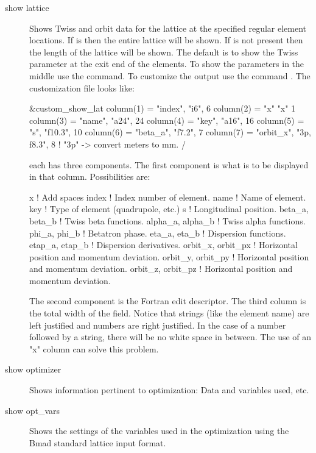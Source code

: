 {{{\begin{description}
  \item[show lattice]
Shows Twiss and orbit data for the  lattice at the specified
regular element locations. If  is  then the
entire lattice will be shown. If  is not present then
the length of the lattice will be shown. The default is to show the Twiss
parameter at the exit end of the elements. To show the parameters in the 
middle use the  command. To customize the output
use the command . The customization
file looks like:
\begin{example}
  &custom_show_lat
    column(1) = "index",   "i6",     6 
    column(2) = "x"        "x"       1
    column(3) = "name",    "a24",   24
    column(4) = "key",     "a16",   16
    column(5) = "s",       "f10.3", 10
    column(6) = "beta_a",  "f7.2",   7
    column(7) = "orbit_x", "3p, f8.3", 8   ! "3p" -> convert meters to mm.
  /
\end{example}
each  has three components. The first component is what is to be 
displayed in that column. Possibilities are:
\begin{example}
  x                  ! Add spaces
  index              ! Index number of element.
  name               ! Name of element.
  key                ! Type of element (quadrupole, etc.)
  s                  ! Longitudinal position.
  beta_a,  beta_b    ! Twiss beta functions.
  alpha_a, alpha_b   ! Twiss alpha functions.
  phi_a,   phi_b     ! Betatron phase.
  eta_a,   eta_b     ! Dispersion functions.
  etap_a,  etap_b    ! Dispersion derivatives.
  orbit_x, orbit_px  ! Horizontal position and momentum deviation.
  orbit_y, orbit_py  ! Horizontal position and momentum deviation.
  orbit_z, orbit_pz  ! Horizontal position and momentum deviation.
\end{example}
The second component is the Fortran edit descriptor. The third column is the total
width of the field. Notice that strings (like the element name) are left justified and
numbers are right justified. In the case of a number followed by a string, 
there will be no white space in between. The use of an "x" column can solve this problem.

  \item[show optimizer]
Shows information pertinent to optimization: Data and variables used, etc.

  \item[show opt\_vars]
Shows the settings of the variables used in the optimization using the 
Bmad standard lattice input format.


\end{description}}}}
